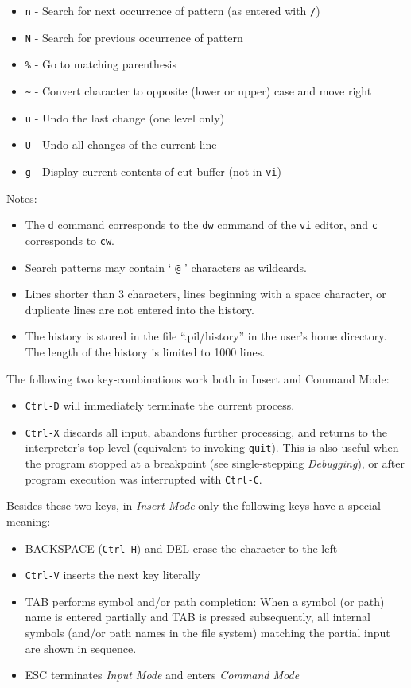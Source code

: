 \begin{itemize}
\item \texttt{n} - Search for next occurrence of pattern (as entered with \texttt{/})
\item \texttt{N} - Search for previous occurrence of pattern
\item \texttt{\%} - Go to matching parenthesis
\item \texttt{\textasciitilde{}} - Convert character to opposite (lower or upper) case and move
   right
\item \texttt{u} - Undo the last change (one level only)
\item \texttt{U} - Undo all changes of the current line
\item \texttt{g} - Display current contents of cut buffer (not in \texttt{vi})
\end{itemize}

Notes:

\begin{itemize}
\item The \texttt{d} command corresponds to the \texttt{dw} command of the \texttt{vi} editor,
   and \texttt{c} corresponds to \texttt{cw}.
\item Search patterns may contain ` \texttt{@} ' characters as wildcards.
\item Lines shorter than 3 characters, lines beginning with a space
   character, or duplicate lines are not entered into the history.
\item The history is stored in the file ``.pil/history'' in the user's home
   directory. The length of the history is limited to 1000 lines.
\end{itemize}

The following two key-combinations work both in Insert and Command Mode:

\begin{itemize}
\item \texttt{Ctrl-D} will immediately terminate the current process.
\item \texttt{Ctrl-X} discards all input, abandons further processing, and returns
   to the interpreter's top level (equivalent to invoking \texttt{quit}). This
   is also useful when the program stopped at a breakpoint (see
   single-stepping \emph{Debugging}), or after program execution was
   interrupted with \texttt{Ctrl-C}.
\end{itemize}

Besides these two keys, in \emph{Insert Mode} only the following keys have a
special meaning:

\begin{itemize}
\item BACKSPACE (\texttt{Ctrl-H}) and DEL erase the character to the left
\item \texttt{Ctrl-V} inserts the next key literally
\item TAB performs symbol and/or path completion: When a symbol (or path)
   name is entered partially and TAB is pressed subsequently, all
   internal symbols (and/or path names in the file system) matching the
   partial input are shown in sequence.
\item ESC terminates \emph{Input Mode} and enters \emph{Command Mode}
\end{itemize}

